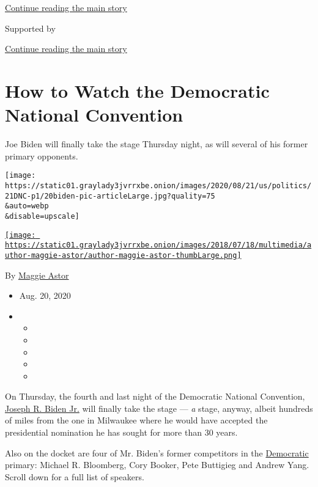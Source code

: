 \protect\hyperlink{after-top}{Continue reading the main story}

Supported by

\protect\hyperlink{after-sponsor}{Continue reading the main story}

\hypertarget{how-to-watch-the-democratic-national-convention}{%
\section{How to Watch the Democratic National
Convention}\label{how-to-watch-the-democratic-national-convention}}

Joe Biden will finally take the stage Thursday night, as will several of
his former primary opponents.

\texttt{[image: https://static01.graylady3jvrrxbe.onion/images/2020/08/21/us/politics/21DNC-p1/20biden-pic-articleLarge.jpg?quality=75\\\&auto=webp\\\&disable=upscale]}

\href{https://www.nytimes3xbfgragh.onion/by/maggie-astor}{\texttt{[image: https://static01.graylady3jvrrxbe.onion/images/2018/07/18/multimedia/author-maggie-astor/author-maggie-astor-thumbLarge.png]}}

By \href{https://www.nytimes3xbfgragh.onion/by/maggie-astor}{Maggie
Astor}

\begin{itemize}
\item
  Aug. 20, 2020
\item
  \begin{itemize}
  \item
  \item
  \item
  \item
  \item
  \end{itemize}
\end{itemize}

On Thursday, the fourth and last night of the Democratic National
Convention,
\href{https://www.nytimes3xbfgragh.onion/interactive/2020/us/elections/joe-biden.html}{Joseph
R. Biden Jr.} will finally take the stage --- \emph{a} stage, anyway,
albeit hundreds of miles from the one in Milwaukee where he would have
accepted the presidential nomination he has sought for more than 30
years.

Also on the docket are four of Mr. Biden's former competitors in the
\href{https://www.nytimes3xbfgragh.onion/2020/08/20/us/politics/dnc-what-to-watch.html}{Democratic}
primary: Michael R. Bloomberg, Cory Booker, Pete Buttigieg and Andrew
Yang. Scroll down for a full list of speakers.

